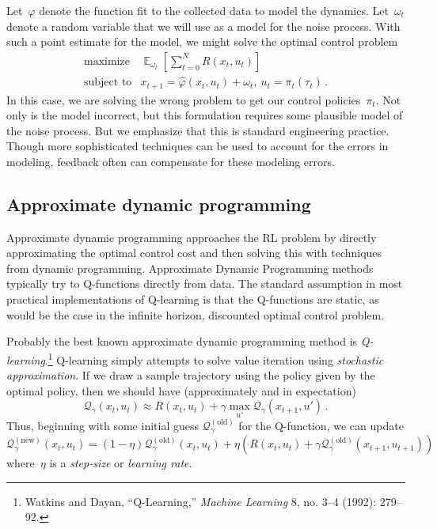 \documentclass{tufte-book}
\begin{document}
Let~\(\hat{\varphi}\) denote the function fit to the collected data to
model the dynamics. Let~\(\omega_t\) denote a random variable that we
will use as a model for the noise process. With such a point estimate
for the model, we might solve the optimal control problem \[
\begin{array}{ll}
\text{maximize} & \mathop\mathbb{E}_{\omega_t}[ \sum_{t=0}^N R(x_t,u_t)  ]\\
\text{subject to} & x_{t+1} = \hat{\varphi}(x_t, u_t)+\omega_t,~u_t = \pi_t(\tau_t)\,.
\end{array}
\] In this case, we are solving the wrong problem to get our control
policies~\(\pi_t\). Not only is the model incorrect, but this
formulation requires some plausible model of the noise process. But we
emphasize that this is standard engineering practice. Though more
sophisticated techniques can be used to account for the errors in
modeling, feedback often can compensate for these modeling errors.

\hypertarget{approximate-dynamic-programming}{%
\subsection{Approximate dynamic
programming}\label{approximate-dynamic-programming}}

Approximate dynamic programming approaches the RL problem by directly
approximating the optimal control cost and then solving this with
techniques from dynamic programming. Approximate Dynamic Programming
methods typically try to Q-functions directly from data. The standard
assumption in most practical implementations of Q-learning is that the
Q-functions are static, as would be the case in the infinite horizon,
discounted optimal control problem.

Probably the best known approximate dynamic programming method is
\emph{Q-learning}.\footnote{Watkins and Dayan, {``Q-Learning,''}
  \emph{Machine Learning} 8, no. 3--4 (1992): 279--92.} Q-learning
simply attempts to solve value iteration using \emph{stochastic
approximation}. If we draw a sample trajectory using
the policy given by the optimal policy, then we should have
(approximately and in expectation) \[
    \mathcal{Q}_\gamma(x_t,u_t) \approx R(x_t,u_t) + \gamma \max_{u'} \mathcal{Q}_\gamma(x_{t+1},u')\,.
\] Thus, beginning with some initial guess
\(\mathcal{Q}_\gamma^{(\mathrm{old})}\) for the Q-function, we can
update \[
    \mathcal{Q}_\gamma^{(\mathrm{new})}(x_t,u_t) = (1-\eta) \mathcal{Q}_\gamma^{(\mathrm{old})}(x_t,u_t) + \eta \left(R(x_t,u_t) + \gamma  \mathcal{Q}_\gamma^{(\mathrm{old})}(x_{t+1},u_{t+1})\right)
\] where~\(\eta\) is a \emph{step-size} or \emph{learning rate}.
\end{document}
